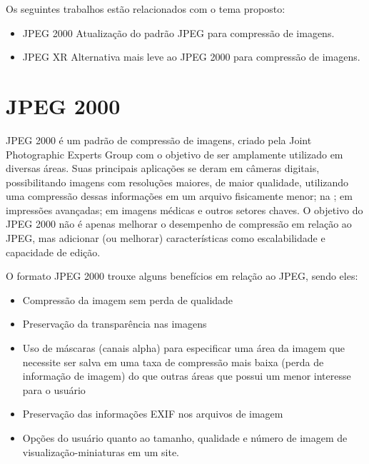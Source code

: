 \documentclass[espaco=simples,appendix=Name]{abnt}
\begin{document}
\begin{description}

\item \noindent
Os seguintes trabalhos estão relacionados com o tema proposto:

\begin{itemize}
	\item JPEG 2000 Atualização do padrão JPEG para compressão de imagens.
	\item JPEG XR Alternativa mais leve ao JPEG 2000 para compressão de imagens.
\end{itemize}

\section{JPEG 2000}
JPEG 2000 é um padrão de compressão de imagens, criado pela Joint Photographic Experts Group com o objetivo de ser amplamente utilizado em diversas áreas. Suas principais aplicações se deram em câmeras digitais, possibilitando imagens com resoluções maiores, de maior qualidade, utilizando uma compressão dessas informações em um arquivo fisicamente menor; na ; em impressões avançadas; em imagens médicas e outros setores chaves. O objetivo do JPEG 2000 não é apenas melhorar o desempenho de compressão em relação ao JPEG, mas adicionar (ou melhorar) características como escalabilidade e capacidade de edição.

O formato JPEG 2000 trouxe alguns benefícios em relação ao JPEG, sendo eles:
\begin{itemize}
	\item Compressão da imagem sem perda de qualidade
	\item Preservação da transparência nas imagens
	\item Uso de máscaras (canais alpha) para especificar uma área da imagem que necessite ser salva em uma taxa de compressão mais baixa (perda de informação de imagem) do que outras áreas que possui um menor interesse para o usuário
	\item Preservação das informações EXIF nos arquivos de imagem
	\item Opções do usuário quanto ao tamanho, qualidade e número de imagem de visualização-miniaturas em um site.
\end{itemize}


\end{description}
\end{document}
